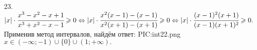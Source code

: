 23. $|x|\cdot\cfrac{x^3-x^2-x+1}{x^3+x^2-x-1}\geqslant 0\Leftrightarrow|x|\cdot\cfrac{x^2(x-1)-(x-1)}{x^2(x+1)-(x+1)}\geqslant 0\Leftrightarrow
|x|\cdot\cfrac{(x-1)^2(x+1)}{(x-1)(x+1)^2}\geqslant 0.$
Применив метод интервалов, найдём ответ:
{{PIC:int22.png}}
$x\in(-\infty;-1)\cup\{0\}\cup(1;+\infty).$\\
